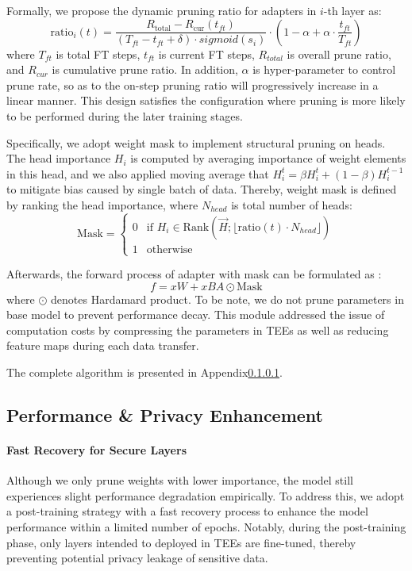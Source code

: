 \documentclass{article}
\begin{document}
Formally, we propose the dynamic pruning ratio for adapters in $i$-th layer as:
\begin{equation}
    \text{ratio}_i(t) = \frac{R_{\text{total}} - R_{\text{cur}}(t_{ft})}{(T_{ft} - t_{ft} + \delta) \cdot sigmoid(s_i)} \cdot \left(1 -\alpha + \alpha \cdot \frac{t_{ft}}{T_{ft}}\right)
\end{equation}
where $T_{ft}$ is total FT steps, $t_{ft}$ is current FT steps, $R_{total}$ is overall prune ratio, and $R_{cur}$ is cumulative prune ratio. In addition, $\alpha$ is hyper-parameter to control prune rate, so as to the on-step pruning ratio will progressively increase in a linear manner. This design satisfies the configuration where pruning is more likely to be performed during the later training stages.

Specifically, we adopt weight mask to implement structural pruning on heads. The head importance $H_i$ is computed by averaging importance of weight elements in this head, and we also applied moving average that $H_i^t = \beta H_{i}^{t} + (1-\beta)H_i^{t-1}$ to mitigate bias caused by single batch of data.
Thereby, weight mask is defined by ranking the head importance, where $N_{head}$ is total number of heads:
\begin{equation}
       \text{Mask} = \begin{cases} 
   0 & \text{if } H_i \in \text{Rank}\left(\vec{H}; \lfloor \text{ratio}(t) \cdot N_{head} \rfloor\right) \\
   1 & \text{otherwise}
   \end{cases}
\end{equation}

Afterwards, the forward process of adapter with mask can be formulated as :
\begin{equation}
    f = xW + xBA \odot \text{Mask}
\end{equation}
where $\odot$ denotes Hardamard product. To be note, we do not prune parameters in base model to prevent performance decay. This module addressed the issue of computation costs by compressing the parameters in TEEs as well as reducing feature maps during each data transfer.

The complete algorithm is presented in Appendix\ref{}.

\subsection{Performance \& Privacy Enhancement}
\paragraph{Fast Recovery for Secure Layers}
Although we only prune weights with lower importance, the model still experiences slight performance degradation empirically. To address this, we adopt a post-training strategy with a fast recovery process to enhance the model performance within a limited number of epochs. Notably, during the post-training phase, only layers intended to deployed in TEEs are fine-tuned, thereby preventing potential privacy leakage of sensitive data.
\end{document}
